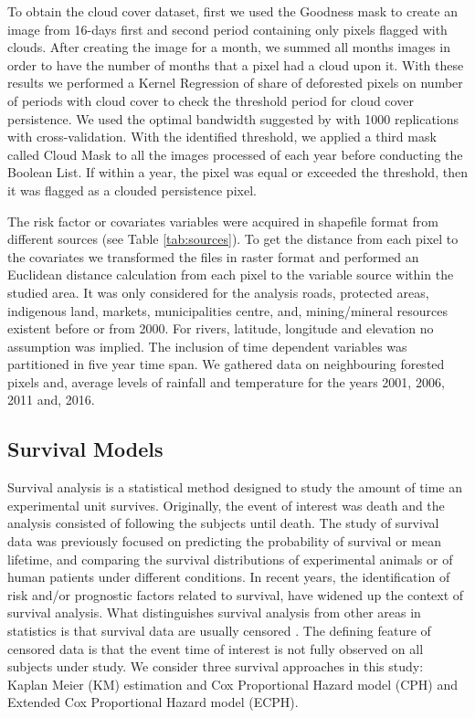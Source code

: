 To obtain the cloud cover dataset, first we used the Goodness mask to create an image from 16-days first and second period containing only pixels flagged with clouds. After creating the image for a month, we summed all months images in order to have the number of months that a pixel had a cloud upon it. With these results we performed a Kernel Regression of share of deforested pixels on number of periods with cloud cover to check the threshold period for cloud cover persistence. We used the optimal bandwidth suggested by \citet{bowman_azzalini_1997} with 1000 replications with cross-validation. With the identified threshold, we applied a third mask called Cloud Mask to all the images processed of each year before conducting the Boolean List. If within a year, the pixel was equal or exceeded the threshold, then it was flagged as a clouded persistence pixel. 


The risk factor or covariates variables were acquired in shapefile format from different sources (see Table \ref{tab:sources}). To get the distance from each pixel to the covariates we transformed the files in raster format and performed an Euclidean distance calculation from each pixel to the variable source within the studied area. It was only considered for the analysis roads, protected areas, indigenous land, markets, municipalities centre, and, mining/mineral resources existent before or from 2000. For rivers, latitude, longitude and elevation no assumption was implied. The inclusion of time dependent variables was partitioned in five year time span. We gathered data on neighbouring forested pixels and, average levels of rainfall and temperature for the years 2001, 2006, 2011 and, 2016. 

\subsection{Survival Models}  %

Survival analysis is a statistical method designed to study the amount of time an experimental unit survives. Originally, the event of interest was death and the analysis consisted of following the subjects until death. The study of survival data was previously focused on predicting the probability of survival or mean lifetime, and comparing the survival distributions of experimental animals or of human patients under different conditions. In recent years, the identification of risk and/or prognostic factors related to survival, have widened up the context of survival analysis. What distinguishes survival analysis from other areas in statistics is that survival data are usually censored \citep{lee_wang_2003,cao_2005}. The defining feature of censored data is that the event time of interest is not fully observed on all subjects under study. We consider three survival approaches in this study: Kaplan Meier (KM) estimation and Cox Proportional Hazard model (CPH) and Extended Cox Proportional Hazard model (ECPH).

